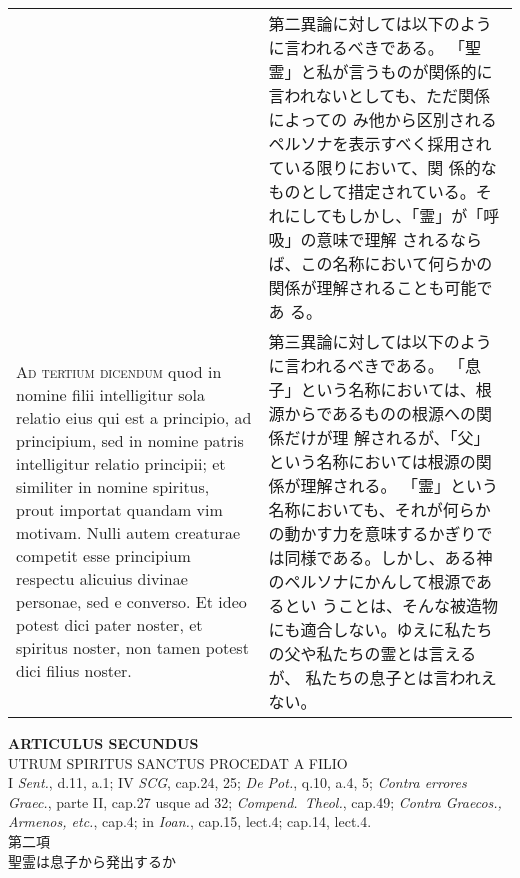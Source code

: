 \documentclass[10pt]{jsarticle} %
\begin{document}
\begin{longtable}{p{21em}p{21em}}
&

第二異論に対しては以下のように言われるべきである。
「聖霊」と私が言うものが関係的に言われないとしても、ただ関係によっての
 み他から区別されるペルソナを表示すべく採用されている限りにおいて、関
 係的なものとして措定されている。それにしてもしかし、「霊」が「呼吸」の意味で理解
 されるならば、この名称において何らかの関係が理解されることも可能であ
 る。



\\



{\scshape Ad tertium dicendum} quod in nomine filii intelligitur sola relatio
eius qui est a principio, ad principium, sed in nomine patris
intelligitur relatio principii; et similiter in nomine spiritus, prout
importat quandam vim motivam. Nulli autem creaturae competit esse
principium respectu alicuius divinae personae, sed e converso. Et ideo
potest dici pater noster, et spiritus noster, non tamen potest dici
filius noster.

&

第三異論に対しては以下のように言われるべきである。
「息子」という名称においては、根源からであるものの根源への関係だけが理
 解されるが、「父」という名称においては根源の関係が理解される。
 「霊」という名称においても、それが何らかの動かす力を意味するかぎりで
 は同様である。しかし、ある神のペルソナにかんして根源であるとい
 うことは、そんな被造物にも適合しない。ゆえに私たちの父や私たちの霊とは言えるが、
 私たちの息子とは言われえない。

\end{longtable}
\newpage


\begin{center}
{\Large {\bf ARTICULUS SECUNDUS}}\\
{\large UTRUM SPIRITUS SANCTUS PROCEDAT A FILIO}\\
{\footnotesize I {\itshape Sent.}, d.11, a.1; IV {\itshape SCG},
 cap.24, 25; {\itshape De Pot.}, q.10, a.4, 5; {\itshape Contra
 errores Graec.}, parte II, cap.27 usque ad 32; {\itshape
 Compend.~Theol.}, cap.49; {\itshape Contra Graecos., Armenos, etc.},
 cap.4; in {\itshape Ioan.}, cap.15, lect.4; cap.14, lect.4.}\\
{\Large 第二項\\聖霊は息子から発出するか}
\end{center}
\end{document}
